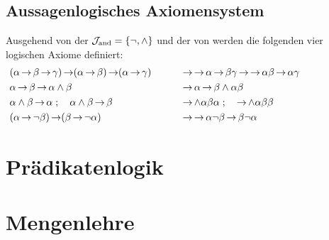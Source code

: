\subsection{Aussagenlogisches Axiomensystem}%
\label{sub:ausAxiome}

Ausgehend von der  $\asJ_\xAnd = \{\lnot, \land\}$ und der  von \symqt{$\limp$} werden die folgenden vier logischen Axiome definiert:
\begin{align}
	&
	(\alpha\limp\beta\limp\gamma)\limp(\alpha\limp\beta)\limp(\alpha\limp\gamma)
	\formulaspace &
	& \limp\limp\alpha\limp\beta\gamma\limp\limp\alpha\beta\limp\alpha\gamma \\
	& \alpha \limp \beta \limp \alpha \land \beta
	\formulaspace &
	& \limp \alpha \limp \beta \land \alpha \beta \\
	& \alpha \land \beta \limp \alpha \;; \quad \alpha \land \beta \limp \beta
	\formulaspace &
	& \limp \land \alpha \beta \alpha \;; \quad \limp \land \alpha \beta \beta\\
	&(\alpha \limp \lnot \beta) \limp (\beta \limp \lnot \alpha)
	\formulaspace &
	& \limp \limp \alpha \lnot \beta \limp \beta \lnot \alpha
	\formulatoleft
\end{align}
%

\section{Prädikatenlogik}%
\label{sec:Praedikatenlogik}


\section{Mengenlehre}%
\label{sec:Mengenlehre}


\Endchapter
